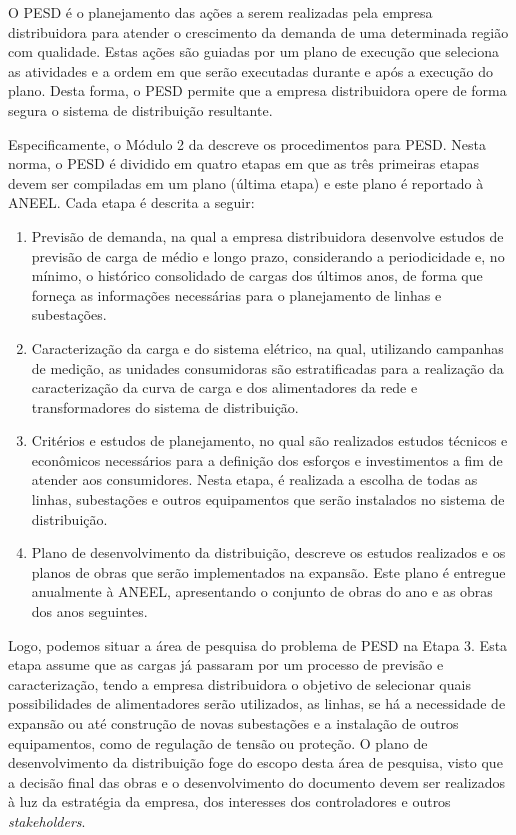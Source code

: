 O \ac{PESD} é o planejamento das ações a serem realizadas pela empresa distribuidora para atender o crescimento da demanda de uma determinada região com qualidade. Estas ações são guiadas por um plano de execução que seleciona as atividades e a ordem em que serão executadas durante e após a execução do plano. Desta forma, o \ac{PESD} permite que a empresa distribuidora opere de forma segura o sistema de distribuição resultante.

Especificamente, o Módulo 2 da  descreve os procedimentos para \ac{PESD}.  Nesta norma, o \ac{PESD} é dividido em quatro etapas em que as três primeiras etapas devem ser compiladas em um plano (última etapa) e este plano é reportado à \ac{ANEEL}. Cada etapa é descrita a seguir:

\begin{enumerate}
    \item Previsão de demanda, na qual a empresa distribuidora desenvolve estudos de previsão de carga de médio e longo prazo, considerando a periodicidade e, no mínimo, o histórico consolidado de cargas dos últimos anos, de forma que forneça as informações necessárias para o planejamento de linhas e subestações. 
    
    \item Caracterização da carga e do sistema elétrico, na qual, utilizando campanhas de medição, as unidades consumidoras são estratificadas para a realização da caracterização da curva de carga e dos alimentadores da rede e transformadores do sistema de distribuição. 

    \item Critérios e estudos de planejamento, no qual são realizados estudos técnicos e econômicos necessários para a definição dos esforços e investimentos a fim de atender aos consumidores. Nesta etapa, é realizada a escolha de todas as linhas, subestações e outros equipamentos que serão instalados no sistema de distribuição.
    
    \item Plano de desenvolvimento da distribuição, descreve os estudos realizados e os planos de obras que serão implementados na expansão. Este plano é entregue anualmente à ANEEL, apresentando o conjunto de obras do ano e as obras dos anos seguintes.

\end{enumerate}

Logo, podemos situar a área de pesquisa do problema de \ac{PESD} na Etapa 3. Esta etapa assume que as cargas já passaram por um processo de previsão e caracterização, tendo a empresa distribuidora o objetivo de selecionar quais possibilidades de alimentadores serão utilizados, as linhas, se há a necessidade de expansão ou até construção de novas subestações e a instalação de outros equipamentos, como de regulação de tensão ou proteção. O plano de desenvolvimento da distribuição foge do escopo desta área de pesquisa, visto que a decisão final das obras e o desenvolvimento do documento devem ser realizados à luz da estratégia da empresa, dos interesses dos controladores e outros \textit{stakeholders}.



